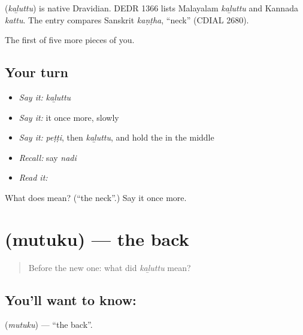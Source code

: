 \begin{cousinweb}
\textbf{} (\emph{kaḻuttu}) is native Dravidian. DEDR 1366 lists Malayalam \emph{kaḻuttu} and Kannada \emph{kattu}. The entry compares Sanskrit \emph{kaṇṭha}, \textquotedblleft{}neck\textquotedblright{} (CDIAL 2680).
\end{cousinweb}

\begin{grammarlens}[title={What you've built}]
The first of five more pieces of you.
\end{grammarlens}

\subsection*{Your turn}
\begin{itemize}
\raggedright
  \item \emph{Say it:} \emph{kaḻuttu}
  \item \emph{Say it:} it once more, slowly
  \item \emph{Say it:} \emph{peṭṭi}, then \emph{kaḻuttu}, and hold the  in the middle
  \item \emph{Recall:} say \emph{nadi}
  \item \emph{Read it:} \textbf{}
\end{itemize}

\begin{tcolorbox}[breakable,colback=teal!4,colframe=teal!35!black,title={Before you move on}]
What does  mean? (\textquotedblleft{}the neck\textquotedblright{}.) Say it once more.
\end{tcolorbox}
\section[\texorpdfstring{\ta{முதுகு} (mutuku)}{முதுகு (mutuku)}]{ (mutuku) — the back}

\label{lesson:TA-C55-back}



\begin{quote}
Before the new one: what did \emph{kaḻuttu} mean?
\end{quote}

\subsection*{You'll want to know: }
\textbf{} (\emph{mutuku}) — \textquotedblleft{}the back\textquotedblright{}.

